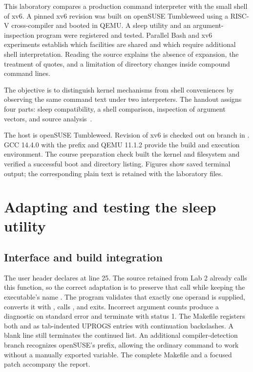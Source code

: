 \documentclass{../latex/utmreport}
\begin{document}
\makeutmreporttitlepage
\tableofcontents
\clearpage
\begin{utmabstract}[Abstract]
This laboratory compares a production command interpreter with the small shell
of xv6. A pinned xv6 revision was built on openSUSE Tumbleweed using a RISC-V
cross-compiler and booted in QEMU. A sleep utility and an argument-inspection
program were registered and tested. Parallel Bash and xv6 experiments establish
which facilities are shared and which require additional shell interpretation.
Reading the source explains the absence of expansion, the treatment of quotes,
and a limitation of directory changes inside compound command lines.
\end{utmabstract}
\utmintroduction
The objective is to distinguish kernel mechanisms from shell conveniences by
observing the same command text under two interpreters. The handout assigns
four parts: sleep compatibility, a shell comparison, inspection of argument
vectors, and source analysis~\cite{handout}.

The host is openSUSE Tumbleweed. Revision
 of xv6 is checked out on branch
 in . GCC 14.4.0 with the
 prefix and QEMU 11.1.2 provide the build and execution
environment. The course preparation check built the kernel and filesystem and
verified a successful boot and directory listing. Figures show saved terminal
output; the corresponding plain text is retained with the laboratory files.

\chapter{Adapting and testing the sleep utility}
\section{Interface and build integration}
The user header declares  at line 25. The source retained
from Lab 2 already calls this function, so the correct adaptation is to preserve
that call while keeping the executable's name . The program validates
that exactly one operand is supplied, converts it with , calls
, and exits. Incorrect argument counts produce a diagnostic on
standard error and terminate with status 1.
The Makefile registers both  and  as tab-indented
UPROGS entries with continuation backslashes. A blank line still terminates the
continued list. An additional compiler-detection branch recognizes openSUSE's
prefix, allowing the ordinary  command to work without a manually
exported variable. The complete Makefile and a focused patch accompany the report.
\end{document}
